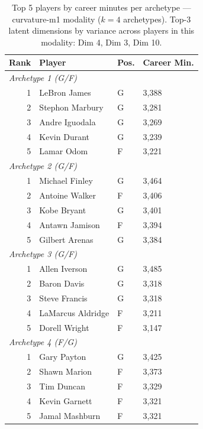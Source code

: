 \begin{table}[htbp]
  \centering\small
  \begin{tabular}{rlll}
    \toprule
    Rank & Player & Pos. & Career Min. \\
    \midrule
    \multicolumn{4}{l}{\textit{Archetype 1 (G/F)}} \\
    \midrule
    1 & LeBron James & G & 3,388 \\
    2 & Stephon Marbury & G & 3,281 \\
    3 & Andre Iguodala & G & 3,269 \\
    4 & Kevin Durant & G & 3,239 \\
    5 & Lamar Odom & F & 3,221 \\
    \midrule[0.4pt]
    \multicolumn{4}{l}{\textit{Archetype 2 (G/F)}} \\
    \midrule
    1 & Michael Finley & G & 3,464 \\
    2 & Antoine Walker & F & 3,406 \\
    3 & Kobe Bryant & G & 3,401 \\
    4 & Antawn Jamison & F & 3,394 \\
    5 & Gilbert Arenas & G & 3,384 \\
    \midrule[0.4pt]
    \multicolumn{4}{l}{\textit{Archetype 3 (G/F)}} \\
    \midrule
    1 & Allen Iverson & G & 3,485 \\
    2 & Baron Davis & G & 3,318 \\
    3 & Steve Francis & G & 3,318 \\
    4 & LaMarcus Aldridge & F & 3,211 \\
    5 & Dorell Wright & F & 3,147 \\
    \midrule[0.4pt]
    \multicolumn{4}{l}{\textit{Archetype 4 (F/G)}} \\
    \midrule
    1 & Gary Payton & G & 3,425 \\
    2 & Shawn Marion & F & 3,373 \\
    3 & Tim Duncan & F & 3,329 \\
    4 & Kevin Garnett & F & 3,321 \\
    5 & Jamal Mashburn & F & 3,321 \\
    \bottomrule
  \end{tabular}
  \caption{Top 5 players by career minutes per archetype --- curvature-m1 modality ($k=4$ archetypes). Top-3 latent dimensions by variance across players in this modality: Dim 4, Dim 3, Dim 10.}
  \label{tab:arch_reps_curvature_m1}
\end{table}

